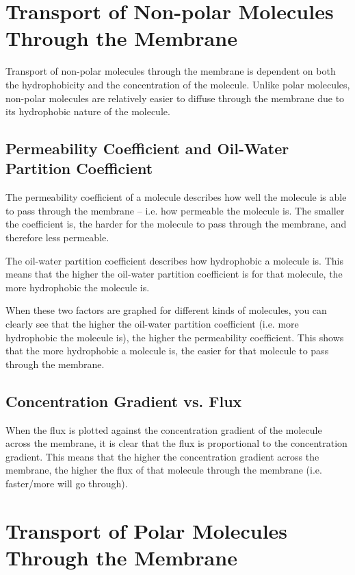 \documentclass[a4paper, 12pt]{report}
\begin{document}
\section{Transport of Non-polar Molecules Through the Membrane}

Transport of non-polar molecules through the membrane is dependent on both the hydrophobicity and the concentration of the molecule.
Unlike polar molecules, non-polar molecules are relatively easier to diffuse through the membrane due to its hydrophobic nature of the molecule.

\subsection{Permeability Coefficient and Oil-Water Partition Coefficient}

The permeability coefficient of a molecule describes how well the molecule is able to pass through the membrane -- i.e. how permeable the molecule is.
The smaller the coefficient is, the harder for the molecule to pass through the membrane, and therefore less permeable.

The oil-water partition coefficient describes how hydrophobic a molecule is.
This means that the higher the oil-water partition coefficient is for that molecule, the more hydrophobic the molecule is.

When these two factors are graphed for different kinds of molecules, you can clearly see that the higher the oil-water partition coefficient (i.e. more hydrophobic the molecule is), the higher the permeability coefficient.
This shows that the more hydrophobic a molecule is, the easier for that molecule to pass through the membrane.

\subsection{Concentration Gradient vs. Flux}

When the  flux  is plotted against the concentration gradient of the molecule across the membrane, it is clear that the flux is proportional to the concentration gradient.
This means that the higher the concentration gradient across the membrane, the higher the flux of that molecule through the membrane (i.e. faster/more will go through).

\section{Transport of Polar Molecules Through the Membrane}
\end{document}
